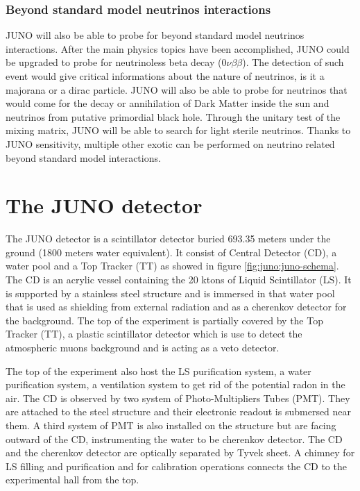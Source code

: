 \subsubsection{Beyond standard model neutrinos interactions}

JUNO will also be able to probe for beyond standard model neutrinos interactions. After the main physics topics have been accomplished, JUNO could be upgraded to probe for neutrinoless beta decay ($0\nu\beta\beta$). The detection of such event would give critical informations about the nature of neutrinos, is it a majorana or a dirac particle. JUNO will also be able to probe for neutrinos that would come for the decay or annihilation of Dark Matter inside the sun and neutrinos from putative primordial black hole.
Through the unitary test of the mixing matrix, JUNO will be able to search for light sterile neutrinos.
Thanks to JUNO sensitivity, multiple other exotic can be performed on neutrino related beyond standard model interactions.


\section{The JUNO detector}
\label{sec:juno:juno_detector}

The JUNO detector is a scintillator detector buried 693.35 meters under the ground (1800 meters water equivalent). It consist of Central Detector (CD), a water pool and a Top Tracker (TT) as showed in figure \ref{fig:juno:juno-schema}.
The CD is an acrylic vessel containing the 20 ktons of Liquid Scintillator (LS). It is supported by a stainless steel structure and is immersed in that water pool that is used as shielding from external radiation and as a cherenkov detector for the background. The top of the experiment is partially covered by the Top Tracker (TT), a plastic scintillator detector which is use to detect the atmospheric muons background and is acting as a veto detector.


The top of the experiment also host the LS purification system, a water purification system, a ventilation system to get rid of the potential radon in the air.
The CD is observed by two system of Photo-Multipliers Tubes (PMT). They are attached to the steel structure and their electronic readout is submersed near them. A third system of PMT is also installed on the structure but are facing outward of the CD, instrumenting the water to be cherenkov detector. The CD and the cherenkov detector are optically separated by Tyvek sheet. A chimney for LS filling and purification and for calibration operations connects the CD to the experimental hall from the top.

